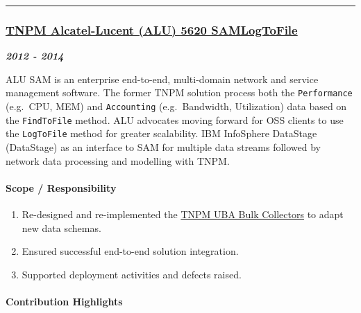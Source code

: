 \documentclass[
]{article}
\providecommand{\tightlist}{%
  \setlength{\itemsep}{0pt}\setlength{\parskip}{0pt}}
\begin{document}
\begin{center}\rule{0.5\linewidth}{0.5pt}\end{center}

\hypertarget{tnpm-alcatel-lucent-alu-5620-samlogtofile}{%
\subsubsection{\texorpdfstring{\href{http://www.ibm.com/support/knowledgecenter/SSBNJ7_1.3.2/com.ibm.tnpm_tp13J.doc/pack_rel_notes/ctnpm_relnotes_alcatel-lucent5620sam_logtofile2.1.0.0_tech_pak.html}{TNPM
Alcatel-Lucent (ALU) 5620
SAMLogToFile}}{TNPM Alcatel-Lucent (ALU) 5620 SAMLogToFile}}\label{tnpm-alcatel-lucent-alu-5620-samlogtofile}}

\textbf{\emph{2012 - 2014}}

ALU SAM is an enterprise end-to-end, multi-domain network and service
management software. The former TNPM solution process both the
\texttt{Performance} (e.g.~CPU, MEM) and \texttt{Accounting}
(e.g.~Bandwidth, Utilization) data based on the \texttt{FindToFile}
method. ALU advocates moving forward for OSS clients to use the
\texttt{LogToFile} method for greater scalability. IBM InfoSphere
DataStage (DataStage) as an interface to SAM for multiple data streams
followed by network data processing and modelling with TNPM.

\hypertarget{scope-responsibility-10}{%
\paragraph{Scope / Responsibility}\label{scope-responsibility-10}}

\begin{enumerate}
\def\labelenumi{\arabic{enumi}.}
\tightlist
\item
  Re-designed and re-implemented the
  \href{http://www.ibm.com/support/knowledgecenter/SSBNJ7_1.4.1/bulk_collector/c_tnpm_bcol_intro_tnpmcollectortypes.html}{TNPM
  UBA Bulk Collectors} to adapt new data schemas.
\item
  Ensured successful end-to-end solution integration.
\item
  Supported deployment activities and defects raised.
\end{enumerate}

\hypertarget{contribution-highlights-9}{%
\paragraph{Contribution Highlights}\label{contribution-highlights-9}}
\end{document}
